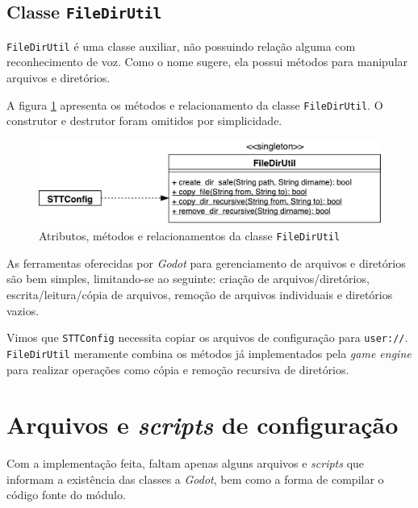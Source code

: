 
\subsection{Classe \texttt{FileDirUtil}}

\texttt{FileDirUtil} é uma classe auxiliar, não possuindo relação alguma com reconhecimento de voz. Como o nome sugere, ela possui métodos para manipular arquivos e diretórios.

A figura \ref{file-dir-util-diagram} apresenta os métodos e relacionamento da classe \texttt{FileDirUtil}. O construtor e destrutor foram omitidos por simplicidade.

\begin{figure}[H]
  \centering
  \includegraphics[width=.75\textwidth]{image/file-dir-util.pdf}
  \caption{Atributos, métodos e relacionamentos da classe \texttt{FileDirUtil}}
  \label{file-dir-util-diagram}
\end{figure}

As ferramentas oferecidas por \textit{Godot} para gerenciamento de arquivos e diretórios são bem simples, limitando-se ao seguinte: criação de arquivos/diretórios, escrita/leitura/cópia de arquivos, remoção de arquivos individuais e diretórios vazios.

Vimos que \texttt{STTConfig} necessita copiar os arquivos de configuração para \texttt{user://}. \texttt{FileDirUtil} meramente combina os métodos já implementados pela \textit{game engine} para realizar operações como cópia e remoção recursiva de diretórios.


\section{Arquivos e \textit{scripts} de configuração}

Com a implementação feita, faltam apenas alguns arquivos e \textit{scripts} que informam a existência das classes a \textit{Godot}, bem como a forma de compilar o código fonte do módulo.

